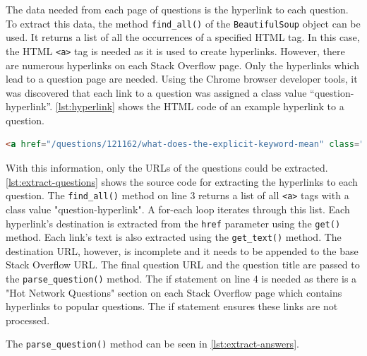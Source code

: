 \documentclass[12pt,a4paper]{article}
\newcommand{\captionstyle}[1] {
    \small{#1}
}
\begin{document}
The data needed from each page of questions is the hyperlink to each question. To extract this data, the method \texttt{find\_all()} of the \texttt{BeautifulSoup} object can be used. It returns a list of all the occurrences of a specified HTML tag. In this case, the HTML \texttt{<a>} tag is needed as it is used to create hyperlinks. However, there are numerous hyperlinks on each Stack Overflow page. Only the hyperlinks which lead to a question page are needed. Using the Chrome browser developer tools, it was discovered that each link to a question was assigned a class value \enquote{question-hyperlink}. \cref{lst:hyperlink} shows the HTML code of an example hyperlink to a question.

\begin{lstlisting}[language=html, caption={\captionstyle{An example hyperlink to a Stack Overflow question.}}, label={lst:hyperlink}]
    <a href="/questions/121162/what-does-the-explicit-keyword-mean" class="question-hyperlink">What does the explicit keyword mean?</a>
\end{lstlisting}

With this information, only the URLs of the questions could be extracted. \cref{lst:extract-questions} shows the source code for extracting the hyperlinks to each question. The \texttt{find\_all()} method on line 3 returns a list of all \texttt{<a>} tags with a class value "question-hyperlink". A for-each loop iterates through this list. Each hyperlink's destination is extracted from the \texttt{href} parameter using the \texttt{get()} method. Each link's text is also extracted using the \texttt{get\_text()} method. The destination URL, however, is incomplete and it needs to be appended to the base Stack Overflow URL. The final question URL and the question title are passed to the \texttt{parse\_question()} method. The if statement on line 4 is needed as there is a "Hot Network Questions" section on each Stack Overflow page which contains hyperlinks to popular questions. The if statement ensures these links are not processed.

The \texttt{parse\_question()} method can be seen in \cref{lst:extract-answers}.
\end{document}
